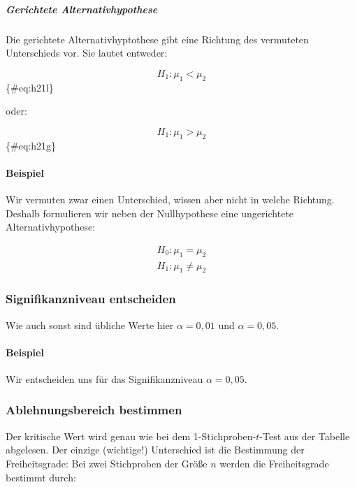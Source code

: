 \documentclass[
  ngerman,
]{article}
\begin{document}
\hypertarget{gerichtete-alternativhypothese-1}{%
\subparagraph{Gerichtete Alternativhypothese}\label{gerichtete-alternativhypothese-1}}

Die gerichtete Alternativhyptothese gibt eine Richtung des vermuteten Unterschieds vor. Sie lautet entweder:

\[
H_1 : \mu_1 < \mu_2
\]\{\#eq:h21l\}

oder:

\[
H_1 : \mu_1 > \mu_2
\]\{\#eq:h21g\}

\hypertarget{beispiel-12}{%
\paragraph{Beispiel}\label{beispiel-12}}

Wir vermuten zwar einen Unterschied, wissen aber nicht in welche Richtung. Deshalb formulieren wir neben der Nullhypothese eine ungerichtete Alternativhypothese:

\[\begin{aligned}
H_0 : \mu_1 = \mu_2\\[4pt]
H_1 : \mu_1 \neq \mu_2
\end{aligned}\]

\hypertarget{signifikanzniveau-entscheiden-2}{%
\subsubsection{Signifikanzniveau entscheiden}\label{signifikanzniveau-entscheiden-2}}

Wie auch sonst sind übliche Werte hier \(\alpha=0{,}01\) und \(\alpha=0{,}05\).

\hypertarget{beispiel-13}{%
\paragraph{Beispiel}\label{beispiel-13}}

Wir entscheiden uns für das Signifikanzniveau \(\alpha=0{,}05\).

\hypertarget{ablehnungsbereich-bestimmen-2}{%
\subsubsection{Ablehnungsbereich bestimmen}\label{ablehnungsbereich-bestimmen-2}}

Der kritische Wert wird genau wie bei dem 1-Stichproben-\(t\)-Test aus der Tabelle abgelesen. Der einzige (wichtige!) Unterschied ist die Bestimmung der Freiheitsgrade: Bei zwei Stichproben der Größe \(n\) werden die Freiheitsgrade bestimmt durch:
\end{document}
